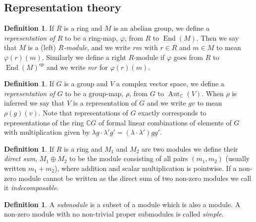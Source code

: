 \documentclass[11pt, a4paper, english]{article}
\theoremstyle{definition}
\newtheorem{defin}[theorem]{Definition}
\newcommand{\C}{\mathbb{C}}
\DeclareMathOperator{\End}{End}
\DeclareMathOperator{\Aut}{Aut}
\begin{document}
\begin{appendices}
\section{Representation theory}
\label{appendix}

\begin{defin}
If $R$ is a ring and $M$ is an abelian group, we define a \textit{representation of $R$} to be a ring-map, $\varphi$, from $R$ to $\End(M)$. Then we say that $M$ is a (left) \textit{$R$-module}, and we write $rm$ with $r \in R$ and $m \in M$ to mean $\varphi(r)(m)$. Similarly we define a right $R$-module if $\varphi$ goes from $R$ to $\End(M)^{op}$ and we write $mr$ for $\varphi(r)(m)$.
\end{defin}

\begin{defin}
If $G$ is a group and $V$ a complex vector space, we define a \textit{representation of $G$} to be a group-map, $\rho$, from $G$ to $\Aut_\C(V)$. When $\rho$ is inferred we say that $V$ is a representation of $G$ and we write $gv$ to mean $\rho(g)(v)$. Note that representations of $G$ exactly corresponds to representations of the ring $\C G$ of formal linear combinations of elements of $G$ with multiplication given by $\lambda g \cdot \lambda' g' = (\lambda \cdot \lambda')gg'$.
\end{defin}

\begin{defin}
\label{def:indecomposable}
If $R$ is a ring and $M_1$ and $M_2$ are two modules we define their \textit{direct sum}, $M_1 \oplus M_2$ to be the module consisting of all pairs $(m_1, m_2)$ (usually written $m_1 + m_2$), where addition and scalar multiplication is pointwise. If a non-zero module cannot be written as the direct sum of two non-zero modules we call it \textit{indecomposable}.
\end{defin}

\begin{defin}
\label{def:simple}
A \textit{submodule} is a subset of a module which is also a module. A non-zero module with no non-trivial proper submodules is called \textit{simple}.
\end{defin}


\end{appendices}
\end{document}
